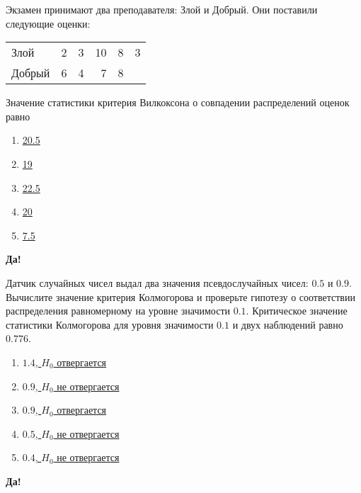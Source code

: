 \documentclass[t]{beamer}
\begin{document}
 \begin{frame} \label{28-Yes} 
\begin{block}{28} 

Экзамен принимают два преподавателя: Злой и Добрый. Они поставили следующие оценки:

\begin{center}
\begin{tabular}{lrrrrr} \toprule
Злой   & 2 & 3 & 10 & 8 & 3 \\
Добрый & 6 & 4 & 7  & 8 & \\
\bottomrule
\end{tabular}
\end{center}

Значение статистики критерия Вилкоксона о совпадении распределений оценок равно

  


 \end{block} 
\begin{enumerate} 
\item[] \hyperlink{28-No}{\beamergotobutton{} 20.5}
\item[] \hyperlink{28-No}{\beamergotobutton{} 19}
\item[] \hyperlink{28-Yes}{\beamergotobutton{} 22.5}
\item[] \hyperlink{28-No}{\beamergotobutton{} 20}
\item[] \hyperlink{28-No}{\beamergotobutton{} 7.5}
\end{enumerate} 

 \textbf{Да!} 
 \hyperlink{29}{}\end{frame} 


 \begin{frame} \label{29-Yes} 
\begin{block}{29} 

Датчик случайных чисел выдал два значения псевдослучайных чисел: $0.5$ и $0.9$. Вычислите значение критерия Колмогорова и проверьте гипотезу о соответствии распределения равномерному на уровне значимости $0.1$. Критическое значение статистики Колмогорова для уровня значимости $0.1$ и двух наблюдений равно $0.776$.
  


 \end{block} 
\begin{enumerate} 
\item[] \hyperlink{29-No}{\beamergotobutton{} $1.4$, $H_0$ отвергается}
\item[] \hyperlink{29-No}{\beamergotobutton{} $0.9$, $H_0$ не отвергается}
\item[] \hyperlink{29-No}{\beamergotobutton{} $0.9$, $H_0$ отвергается}
\item[] \hyperlink{29-Yes}{\beamergotobutton{} $0.5$, $H_0$ не отвергается}
\item[] \hyperlink{29-No}{\beamergotobutton{} $0.4$, $H_0$ не отвергается}
\end{enumerate} 

 \textbf{Да!} 
 \hyperlink{30}{}\end{frame} 
\end{document}

